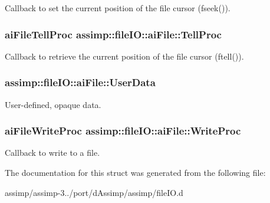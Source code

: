 Callback to set the current position of the file cursor ({\ttfamily fseek()}). \hypertarget{structassimp_1_1file_i_o_1_1ai_file_a49a120ebe6246b31a39fbf4911fcc2bd}{
\subsubsection[{Tell\+Proc}]{\setlength{\rightskip}{0pt plus 5cm}ai\+File\+Tell\+Proc assimp\+::file\+I\+O\+::ai\+File\+::\+Tell\+Proc}}\label{structassimp_1_1file_i_o_1_1ai_file_a49a120ebe6246b31a39fbf4911fcc2bd}
Callback to retrieve the current position of the file cursor ({\ttfamily ftell()}). \hypertarget{structassimp_1_1file_i_o_1_1ai_file_a00a10fe3fe0dbe0b48ac4e7cfe22519d}{
\subsubsection[{User\+Data}]{ assimp\+::file\+I\+O\+::ai\+File\+::\+User\+Data}}\label{structassimp_1_1file_i_o_1_1ai_file_a00a10fe3fe0dbe0b48ac4e7cfe22519d}
User-\/defined, opaque data. \hypertarget{structassimp_1_1file_i_o_1_1ai_file_a571a1f7f01fca775a502c81ce844a3d5}{
\subsubsection[{Write\+Proc}]{\setlength{\rightskip}{0pt plus 5cm}ai\+File\+Write\+Proc assimp\+::file\+I\+O\+::ai\+File\+::\+Write\+Proc}}\label{structassimp_1_1file_i_o_1_1ai_file_a571a1f7f01fca775a502c81ce844a3d5}
Callback to write to a file. 

The documentation for this struct was generated from the following file\+:\begin{DoxyCompactItemize}
\item 
assimp/assimp-\/3../port/d\+Assimp/assimp/file\+I\+O.\+d\end{DoxyCompactItemize}
